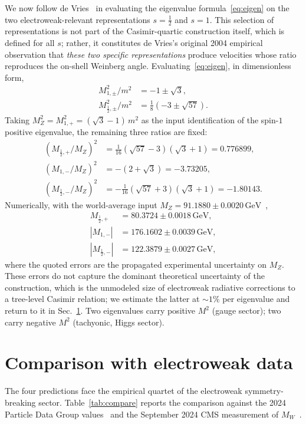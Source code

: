 \documentclass[twocolumn,aps,prd,floatfix,nofootinbib,superscriptaddress,10pt]{article}
\newcommand{\MW}{M_W}
\newcommand{\MZ}{M_Z}
\newcommand{\GeV}{\,\mathrm{GeV}}
\begin{document}
We now follow de Vries~\cite{deVries2004} in evaluating the eigenvalue formula~\eqref{eq:eigen} on the two electroweak-relevant representations $s=\tfrac12$ and $s=1$. This selection of representations is not part of the Casimir-quartic construction itself, which is defined for all $s$; rather, it constitutes de Vries's original 2004 empirical observation that {\em these two specific representations} produce velocities whose ratio reproduces the on-shell Weinberg angle. Evaluating~\eqref{eq:eigen}, in dimensionless form,
\begin{align}
M^2_{1,\pm}/m^2 &= -1 \pm \sqrt{3}, \\
M^2_{\tfrac12,\pm}/m^2 &= \tfrac{1}{8}\!\left(-3 \pm \sqrt{57}\right).
\end{align}
Taking $\MZ^2 = M^2_{1,+} = (\sqrt{3}-1)\,m^2$ as the input identification of the spin-$1$ positive eigenvalue, the remaining three ratios are fixed:
\begin{align}
\left(M_{\tfrac12,+}/\MZ\right)^2 &= \tfrac{1}{16}(\sqrt{57}-3)(\sqrt{3}+1) = 0.776899,\\
\left(M_{1,-}/\MZ\right)^2 &= -(2+\sqrt{3}) = -3.73205,\\
\left(M_{\tfrac12,-}/\MZ\right)^2 &= -\tfrac{1}{16}(\sqrt{57}+3)(\sqrt{3}+1) = -1.80143.
\end{align}
Numerically, with the world-average input $\MZ=91.1880\pm 0.0020\GeV$~\cite{PDG2024},
\begin{align}
M_{\tfrac12,+} &= 80.3724 \pm 0.0018 \GeV, \\
|M_{1,-}| &= 176.1602 \pm 0.0039 \GeV, \\
|M_{\tfrac12,-}| &= 122.3879 \pm 0.0027 \GeV,
\end{align}
where the quoted errors are the propagated experimental uncertainty on $\MZ$. These errors do not capture the dominant theoretical uncertainty of the construction, which is the unmodeled size of electroweak radiative corrections to a tree-level Casimir relation; we estimate the latter at $\sim 1\%$ per eigenvalue and return to it in Sec.~\ref{sec:compare}. Two eigenvalues carry positive $M^2$ (gauge sector); two carry negative $M^2$ (tachyonic, Higgs sector).

\section{Comparison with electroweak data}
\label{sec:compare}

The four predictions face the empirical quartet of the electroweak symmetry-breaking sector. Table~\ref{tab:compare} reports the comparison against the 2024 Particle Data Group values~\cite{PDG2024} and the September 2024 CMS measurement of $\MW$~\cite{CMS2024W}.
\end{document}
